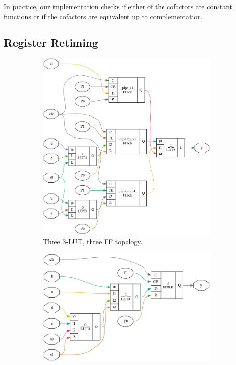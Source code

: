 In practice, our implementation checks if either of the cofactors are constant
functions or if the cofactors are equivalent up to complementation.

\subsection{Register Retiming}\label{sec:rewrites:retiming}

\begin{figure}[tb]
    \begin{subfigure}{0.33\textwidth}
        \centering
        \includegraphics[width=\textwidth]{img/mux_4_1.png}
        \caption{Three 3-LUT, three FF topology.}\label{fig:retiming:a}
        \Description[]{}
    \end{subfigure}
    \begin{subfigure}{0.33\textwidth}
        \centering
        \includegraphics[width=\textwidth]{img/mux_4_1_retime_dsd.png}

\end{subfigure}
\end{figure}

